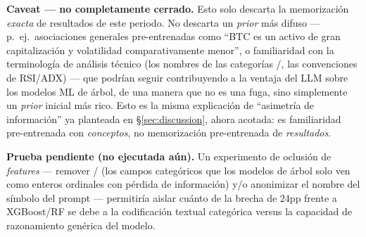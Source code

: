 \textbf{Caveat --- no completamente cerrado.} Esto solo descarta la memorizaci\'on \textit{exacta} de resultados de este periodo. No descarta un \textit{prior} m\'as difuso --- p.\ ej.\ asociaciones generales pre-entrenadas como ``BTC es un activo de gran capitalizaci\'on y volatilidad comparativamente menor'', o familiaridad con la terminolog\'ia de an\'alisis t\'ecnico (los nombres de las categor\'ias /, las convenciones de RSI/ADX) --- que podr\'ian seguir contribuyendo a la ventaja del LLM sobre los modelos ML de \'arbol, de una manera que no es una fuga, sino simplemente un \textit{prior} inicial m\'as rico. Esto es la misma explicaci\'on de ``asimetr\'ia de informaci\'on'' ya planteada en \S\ref{sec:discussion}, ahora acotada: es familiaridad pre-entrenada con \textit{conceptos}, no memorizaci\'on pre-entrenada de \textit{resultados}.

\textbf{Prueba pendiente (no ejecutada a\'un).} Un experimento de oclusi\'on de \textit{features} --- remover / (los campos categ\'oricos que los modelos de \'arbol solo ven como enteros ordinales con p\'erdida de informaci\'on) y/o anonimizar el nombre del s\'imbolo del prompt --- permitir\'ia aislar cu\'anto de la brecha de 24pp frente a XGBoost/RF se debe a la codificaci\'on textual categ\'orica versus la capacidad de razonamiento gen\'erica del modelo.
